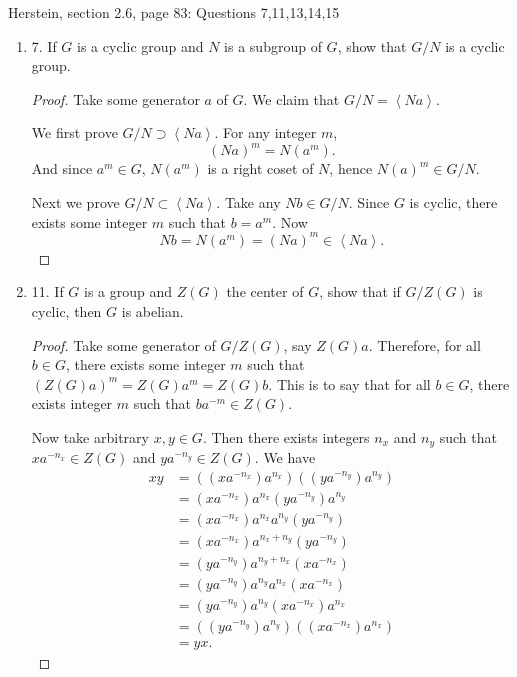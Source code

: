 \newpage
Herstein, section 2.6, page 83: Questions 7,11,13,14,15
\begin{enumerate}[resume]
	\item 7. If $G$ is a cyclic group and $N$ is a subgroup of $G$, show that $G / N$ is a cyclic group.
\begin{proof}
	Take some generator $a$ of $G$. We claim that $G / N = \left\langle Na \right\rangle $.

	We first prove $G / N \supset \left\langle Na \right\rangle $. For any integer $m$, 
	\[
		(Na)^m = N(a^m)
	.\] 
	And since $a^m \in G$, $N(a^m)$ is a right coset of $N$, hence $N(a)^m \in G / N$.

	Next we prove $G / N \subset \left\langle Na \right\rangle $. Take any $Nb \in G / N$. Since  $G$ is cyclic, there exists some integer $m$ such that $b = a^m$. Now
	\[
		Nb = N(a^m) = (Na)^m \in \left\langle Na \right\rangle 
	.\] 
\end{proof}

	\item 11. If $G$ is a group and $Z(G)$ the center of $G$, show that if $G / Z(G)$ is cyclic, then $G$ is abelian.
\begin{proof}
	Take some generator of $G / Z(G)$, say $Z(G)a$. Therefore, for all $b \in  G$, there exists some integer $m$ such that $\left(Z(G)a\right)^m = Z(G)a^m = Z(G)b$. This is to say that for all $b \in G$, there exists integer  $m$ such that $b a^{-m} \in Z(G)$.

	Now take arbitrary $x, y \in G$. Then there exists integers $n_x$ and  $n_y$ such that $x a^{-n_x}\in Z(G)$ and $y a^{- n_y} \in Z(G)$. We have
	\begin{align*}
		xy 
		&=  
		\left((xa^{-n_x})a^{n_x}\right)
		\left((ya^{-n_y})a^{n_y}\right) \\
		&=  
		(xa^{-n_x})a^{n_x}
		(ya^{-n_y})a^{n_y} \\
		&=  
		(xa^{-n_x})a^{n_x}
		a^{n_y}(ya^{-n_y}) \\
		&=  
		(xa^{-n_x})a^{n_x+n_y}(ya^{-n_y}) \\
		&=  
		(ya^{-n_y})a^{n_y+n_x}(xa^{-n_x}) \\
		&= 
		(ya^{-n_y})a^{n_y} 
		a^{n_x}(xa^{-n_x})\\
		&= 
		(ya^{-n_y})a^{n_y} 
		(xa^{-n_x})a^{n_x}\\
		&= 
		\left((ya^{-n_y})a^{n_y}\right) 
		\left((xa^{-n_x})a^{n_x}\right)\\
		&= yx
	.\end{align*}
\end{proof}


\end{enumerate}
